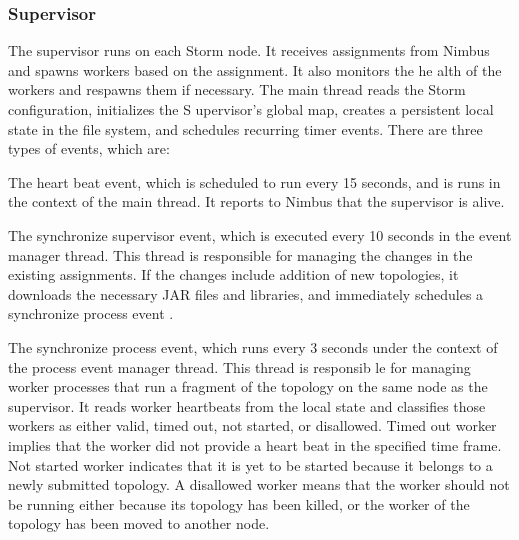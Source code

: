 \documentclass[9pt,twocolumn,twoside]{../../styles/osajnl}
\begin{document}
\subsubsection{Supervisor}
The supervisor runs on each Storm node. It receives assignments from
Nimbus and spawns workers based on the assignment. It also monitors
the he alth of the workers and respawns them if necessary. The main
thread reads the Storm configuration, initializes the S upervisor’s
global map, creates a persistent local state in the file system, and
schedules recurring timer events. There are three types of events,
which are:

\begin{description}
\item The heart beat event, which is scheduled to run every 15
  seconds, and is runs in the context of the main thread. It reports
  to Nimbus that the supervisor is alive.
\item The synchronize supervisor event, which is executed every 10
  seconds in the event manager thread. This thread is responsible for
  managing the changes in the existing assignments. If the changes
  include addition of new topologies, it downloads the necessary JAR
  files and libraries, and immediately schedules a synchronize process
  event .
\item The synchronize process event, which runs every 3 seconds under
  the context of the process event manager thread. This thread is
  responsib le for managing worker processes that run a fragment of
  the topology on the same node as the supervisor. It reads worker
  heartbeats from the local state and classifies those workers as
  either valid, timed out, not started, or disallowed. Timed out
  worker implies that the worker did not provide a heart beat in the
  specified time frame. Not started worker indicates that it is yet to
  be started because it belongs to a newly submitted topology. A
  disallowed worker means that the worker should not be running either
  because its topology has been killed, or the worker of the topology
  has been moved to another node.
\end{description}
\end{document}
